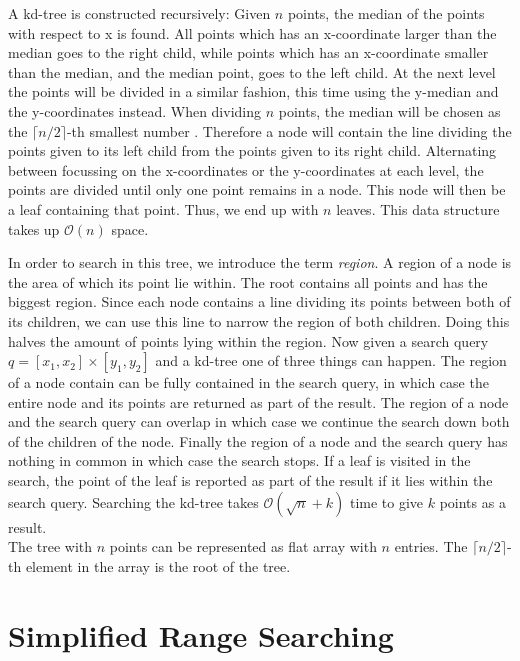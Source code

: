 A kd-tree is constructed recursively: Given $n$ points, the median of the points with respect to x is found. All points which has an x-coordinate larger than the median goes to the right child, while points which has an x-coordinate smaller than the median, and the median point, goes to the left child. At the next level the points will be divided in a similar fashion, this time using the y-median and the y-coordinates instead. When dividing $n$ points, the median will be chosen as the $\lceil n/2 \rceil$-th smallest number \cite{compgeo}. Therefore a node will contain the line dividing the points given to its left child from the points given to its right child.
Alternating between focussing on the x-coordinates or the y-coordinates at each level, the points are divided until only one point remains in a node. This node will then be a leaf containing that point. Thus, we end up with $n$ leaves. This data structure takes up $\mathcal{O}(n)$ space.

In order to search in this tree, we introduce the term \emph{region}. A region of a node is the area of which its point lie within. The root contains all points and has the biggest region. Since each node contains a line dividing its points between both of its children, we can use this line to narrow the region of both children. Doing this halves the amount of points lying within the region. Now given a search query $q = [x_1, x_2] \times [y_1, y_2]$ and a kd-tree one of three things can happen. The region of a node contain can be fully contained in the search query, in which case the entire node and its points are returned as part of the result. The region of a node and the search query can overlap in which case we continue the search down both of the children of the node. Finally the region of a node and the search query has nothing in common in which case the search stops. If a leaf is visited in the search, the point of the leaf is reported as part of the result if it lies within the search query. Searching the kd-tree takes $\mathcal{O}(\sqrt{n} + k)$ time to give $k$ points as a result. \\


The tree with $n$ points can be represented as flat array with $n$ entries. The $\lceil n/2 \rceil$-th element in the array is the root of the tree. 


\section{Simplified Range Searching}

